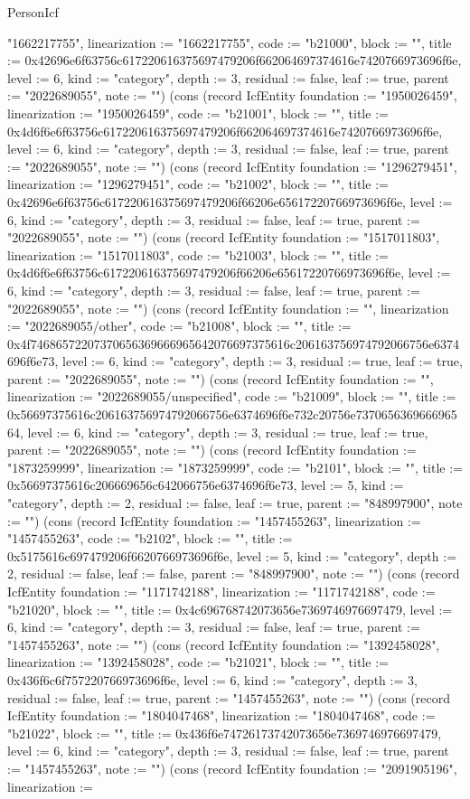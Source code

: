 \begin{lexlean}{PersonIcf}
\begin{semanticmodule}
{"1662217755", linearization := "1662217755", code := "b21000", block := "", title := 0x42696e6f63756c617220616375697479206f662064697374616e7420766973696f6e, level := 6, kind := "category", depth := 3, residual := false, leaf := true, parent := "2022689055", note := ""}) (cons (record IcfEntity {foundation := "1950026459", linearization := "1950026459", code := "b21001", block := "", title := 0x4d6f6e6f63756c617220616375697479206f662064697374616e7420766973696f6e, level := 6, kind := "category", depth := 3, residual := false, leaf := true, parent := "2022689055", note := ""}) (cons (record IcfEntity {foundation := "1296279451", linearization := "1296279451", code := "b21002", block := "", title := 0x42696e6f63756c617220616375697479206f66206e65617220766973696f6e, level := 6, kind := "category", depth := 3, residual := false, leaf := true, parent := "2022689055", note := ""}) (cons (record IcfEntity {foundation := "1517011803", linearization := "1517011803", code := "b21003", block := "", title := 0x4d6f6e6f63756c617220616375697479206f66206e65617220766973696f6e, level := 6, kind := "category", depth := 3, residual := false, leaf := true, parent := "2022689055", note := ""}) (cons (record IcfEntity {foundation := "", linearization := "2022689055/other", code := "b21008", block := "", title := 0x4f74686572207370656369666965642076697375616c206163756974792066756e6374696f6e73, level := 6, kind := "category", depth := 3, residual := true, leaf := true, parent := "2022689055", note := ""}) (cons (record IcfEntity {foundation := "", linearization := "2022689055/unspecified", code := "b21009", block := "", title := 0x56697375616c206163756974792066756e6374696f6e732c20756e737065636966696564, level := 6, kind := "category", depth := 3, residual := true, leaf := true, parent := "2022689055", note := ""}) (cons (record IcfEntity {foundation := "1873259999", linearization := "1873259999", code := "b2101", block := "", title := 0x56697375616c206669656c642066756e6374696f6e73, level := 5, kind := "category", depth := 2, residual := false, leaf := true, parent := "848997900", note := ""}) (cons (record IcfEntity {foundation := "1457455263", linearization := "1457455263", code := "b2102", block := "", title := 0x5175616c697479206f6620766973696f6e, level := 5, kind := "category", depth := 2, residual := false, leaf := false, parent := "848997900", note := ""}) (cons (record IcfEntity {foundation := "1171742188", linearization := "1171742188", code := "b21020", block := "", title := 0x4c696768742073656e7369746976697479, level := 6, kind := "category", depth := 3, residual := false, leaf := true, parent := "1457455263", note := ""}) (cons (record IcfEntity {foundation := "1392458028", linearization := "1392458028", code := "b21021", block := "", title := 0x436f6c6f757220766973696f6e, level := 6, kind := "category", depth := 3, residual := false, leaf := true, parent := "1457455263", note := ""}) (cons (record IcfEntity {foundation := "1804047468", linearization := "1804047468", code := "b21022", block := "", title := 0x436f6e74726173742073656e7369746976697479, level := 6, kind := "category", depth := 3, residual := false, leaf := true, parent := "1457455263", note := ""}) (cons (record IcfEntity {foundation := "2091905196", linearization := }
\end{semanticmodule}
\end{lexlean}
